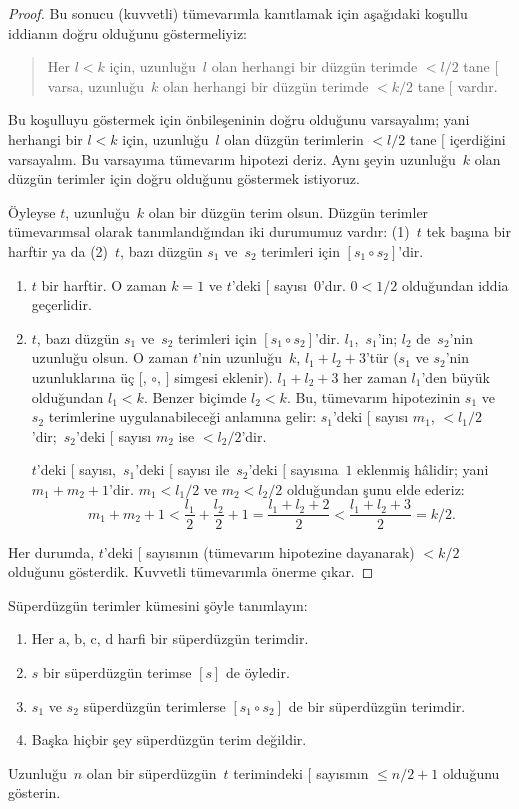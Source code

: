 \documentclass[../../../include/open-logic-section]{subfiles}
\begin{document}
\begin{proof}
Bu sonucu (kuvvetli) tümevarımla kanıtlamak için aşağıdaki koşullu
iddianın doğru olduğunu göstermeliyiz:
\begin{quote}
  Her $l < k$ için, uzunluğu~$l$ olan herhangi bir düzgün terimde $<
  l/2$ tane $[$ varsa, uzunluğu~$k$ olan herhangi bir düzgün terimde
  $< k/2$ tane $[$ vardır.
\end{quote}
Bu koşulluyu göstermek için önbileşeninin doğru olduğunu varsayalım;
yani herhangi bir $l<k$ için, uzunluğu~$l$ olan düzgün terimlerin $<
l/2$ tane $[$ içerdiğini varsayalım. Bu varsayıma tümevarım hipotezi
deriz. Aynı şeyin uzunluğu~$k$ olan düzgün terimler için doğru olduğunu
göstermek istiyoruz.

Öyleyse $t$, uzunluğu~$k$ olan bir düzgün terim olsun. Düzgün terimler
tümevarımsal olarak tanımlandığından iki durumumuz vardır: (1)~$t$ tek
başına bir harftir ya da (2)~$t$, bazı düzgün $s_1$ ve~$s_2$ terimleri
için $[s_1 \circ s_2]$'dir.
\begin{enumerate}
\item $t$ bir harftir. O zaman $k = 1$ ve $t$'deki $[$ sayısı~$0$'dır.
$0 < 1/2$ olduğundan iddia geçerlidir.
\item $t$, bazı düzgün $s_1$ ve~$s_2$ terimleri için $[s_1 \circ
  s_2]$'dir. $l_1$,~$s_1$'in; $l_2$ de~$s_2$'nin uzunluğu olsun.
  O zaman $t$'nin uzunluğu~$k$, $l_1+l_2+3$'tür ($s_1$ ve $s_2$'nin
  uzunluklarına üç $[$, $\circ$, $]$ simgesi eklenir).
  $l_1+l_2+3$ her zaman $l_1$'den büyük olduğundan $l_1 < k$.
  Benzer biçimde $l_2 < k$. Bu, tümevarım hipotezinin $s_1$ ve~$s_2$
  terimlerine uygulanabileceği anlamına gelir: $s_1$'deki $[$ sayısı
  $m_1$, $< l_1/2$'dir;~$s_2$'deki $[$ sayısı $m_2$ ise $< l_2/2$'dir.

  $t$'deki $[$ sayısı,~$s_1$'deki $[$ sayısı ile~$s_2$'deki $[$
  sayısına~$1$ eklenmiş hâlidir; yani $m_1 + m_2 + 1$'dir. $m_1 <
  l_1/2$ ve $m_2 < l_2/2$ olduğundan şunu elde ederiz:
  \[
  m_1 + m_2 + 1 < \frac{l_1}{2} + \frac{l_2}{2} + 1 = \frac{l_1+l_2+2}{2} < \frac{l_1+l_2+3}{2} = k/2.
  \]
\end{enumerate}
Her durumda, $t$'deki $[$ sayısının (tümevarım hipotezine dayanarak)
$< k/2$ olduğunu gösterdik. Kuvvetli tümevarımla önerme çıkar.
\end{proof}

\begin{prob}
  Süperdüzgün terimler kümesini şöyle tanımlayın:
  \begin{enumerate}
  \item Her $\mathrm{a}$, $\mathrm{b}$, $\mathrm{c}$, $\mathrm{d}$
    harfi bir süperdüzgün terimdir.
  \item $s$ bir süperdüzgün terimse $[s]$ de öyledir.
  \item $s_1$ ve $s_2$ süperdüzgün terimlerse $[s_1 \circ s_2]$ de
    bir süperdüzgün terimdir.
  \item Başka hiçbir şey süperdüzgün terim değildir.
  \end{enumerate}
  Uzunluğu~$n$ olan bir süperdüzgün~$t$ terimindeki $[$ sayısının
  $\le n/2 +1$ olduğunu gösterin.
\end{prob}
\end{document}
